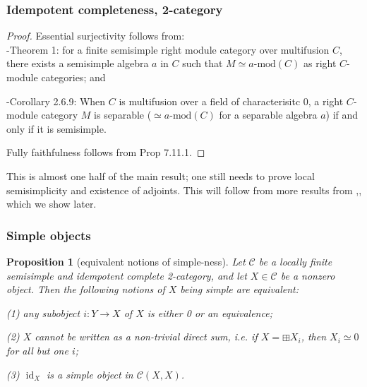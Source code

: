 \documentclass{beamer}
\DeclareMathOperator{\id}{id}
\newtheorem{proposition}[theorem]{Proposition}
\newcommand{\cC}{{\mathcal{C}}}
\newcommand{\amod}[1]{{#1\textrm{-mod}}}
\begin{document}
\begin{frame}
\frametitle{Idempotent completeness, 2-category}

\begin{proof}
Essential surjectivity follows from:\\
-\cite{Ostrik}{Theorem 1}: for a finite semisimple right module
category over multifusion $C$, there exists a semisimple algebra
$a$ in $C$ such that $M \simeq \amod{a}(C)$
as right $C$-module categories; and

\pause
-\cite{DSPSb}{Corollary 2.6.9}: When $C$ is multifusion over
a field of characterisitc 0,
a right $C$-module category $M$ is separable
($\simeq \amod{a}(C)$ for a separable algebra $a$)
if and only if it is semisimple.

\pause

Fully faithfulness follows from \cite{EGNO}{Prop 7.11.1}.
\end{proof}

\pause

This is almost one half of the main result;
one still needs to prove local semisimplicity
and existence of adjoints.
This will follow from more results from \cite{DSPSa},\cite{DSPSb},
which we show later.

\end{frame}
\begin{frame}
\frametitle{Simple objects}

\pause

\begin{proposition}[equivalent notions of simple-ness]
Let $\cC$ be a locally finite semisimple and
idempotent complete 2-category,
and let $X \in \cC$ be a nonzero object.
Then the following notions of $X$ being simple are equivalent:

\pause

(1) any subobject $i: Y \to X$ of $X$
 is either 0 or an equivalence;

\pause

(2) $X$ cannot be written as a non-trivial direct sum,
	i.e. if $X = \boxplus X_i$,
	then $X_i \simeq 0$ for all but one $i$;

\pause

(3) $\id_X$ is a simple object in $\cC(X,X)$.
\end{proposition}

\end{frame}
\end{document}
